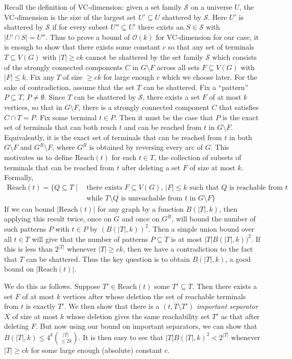 \documentclass[11pt]{article}
\newcommand{\Reach}{\mathrm{Reach}\xspace}
\renewcommand{\SS}{\mathcal{S}}
\newcommand{\OO}{\mathcal{O}}
\begin{document}
Recall the definition of VC-dimension: given a set family $\SS$ on a universe $U$, the VC-dimension is the size of the largest set $U' \subseteq U$ shattered by $\SS$. Here $U'$ is shattered by $\SS$ if for every subset $U'' \subseteq U'$ there exists an $S \in \SS$ with $|U' \cap S| = U''$. Thus to prove a bound of $\OO(k)$ for VC-dimension for our case, it is enough to show that there exists some constant $c$ so that any set of terminals $T \subseteq V(G)$ with $|T| \geq ck$ cannot be shattered by the set family $\SS$ which consists of the strongly connected components $C$ in $G \setminus F$ across all sets $F \subseteq V(G)$ with $|F| \leq k$. Fix any $T$ of size $\geq ck$ for large enough $c$ which we choose later. For the sake of contradiction, assume that the set $T$ can be shattered. Fix a ``pattern'' $P \subseteq T$, $P \neq \emptyset$. Since $T$ can be shattered by $\SS$, there exists a set $F$ of at most $k$ vertices, so that in $G \setminus F$, there is a strongly connected component $C$ that satisfies $C \cap T = P$. Fix some terminal $t \in P$. Then it must be the case that $P$ is the exact set of terminals that can both reach $t$ and can be reached from $t$ in $G \setminus F$. Equivalently, it is the exact set of terminals that can be reached from $t$ in both $G \setminus F$ and $G^R \setminus F$, where $G^R$ is obtained by reversing every arc of $G$. This motivates us to define $\Reach(t)$ for each $t \in T$, 
the collection of subsets of terminals that can be reached from $t$ after deleting a set $F$ of size at most $k$. Formally,
\begin{align*}
\Reach(t) = \{Q \subseteq T \mid\, & \text{there exists $F \subseteq V(G)$, $|F| \leq k$ such that $Q$ is reachable from $t$} \\&\text{while $T \setminus Q$ is unreachable from $t$ in $G \setminus F$}\}
\end{align*}
If we can bound $|\Reach(t)|$ for any graph by a function $B(|T|,k)$, then applying this result twice, once on $G$ and once on $G^R$, will bound the number of such patterns $P$ with $t \in P$ by $(B(|T|,k))^2$. Then a simple union bound over all $t \in T$ will give that the number of patterns $P \subseteq T$ is at most $|T|B(|T|,k))^2$. If this is less than $2^{|T|}$ whenever $|T| \geq ck$, then we have a contradiction to the fact that $T$ can be shattered. Thus the key question is to obtain $B(|T|,k)$, a good bound on $|\Reach(t)|$.

We do this as follows. Suppose $T' \in 
\Reach(t)$ some $T' \subseteq T$. Then there exists a set $F$ of at most $k$ vertices after whose deletion the set of reachable terminals from $t$ is exactly $T'$. We then show that there is a $(t, T \setminus T')$ \emph{important separator} $X$ of size at most $k$ whose deletion gives the same reachability set $T'$ as that after deleting $F$. But now using our bound on important separators, we can show that $B(|T|,k) \leq 4^k {|T| \choose \leq 2k}$. It is then easy to see that $|T|B(|T|,k)^2 < 2^{|T|}$ whenever $|T| \geq ck$ for some large enough (absolute) constant $c$. 
\end{document}
